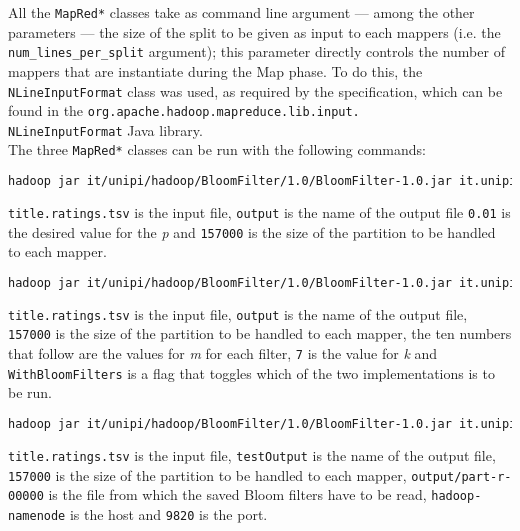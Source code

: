 \hfill \break
All the \texttt{MapRed*} classes take as command line argument --- among the other parameters --- the size of the split to be given as input to each mappers (i.e. the \texttt{num\_lines\_per\_split} argument); this parameter directly controls the number of mappers that are instantiate during the Map phase. To do this, the \texttt{NLineInputFormat} class was used, as required by the specification, which can be found in the \texttt{org.apache.hadoop.mapreduce.lib.input.\\NLineInputFormat} Java library.\\
\hfill \break
The three \texttt{MapRed*} classes can be run with the following commands:\\

\begin{lstlisting}[language=Bash, breaklines=true, backgroundcolor = \color{lightgray}]
hadoop jar it/unipi/hadoop/BloomFilter/1.0/BloomFilter-1.0.jar it.unipi.hadoop.MapRedComputeParams title.ratings.tsv output 0.01 157000
\end{lstlisting}
\hfill \break
\texttt{title.ratings.tsv} is the input file, \texttt{output} is the name of the output file \texttt{0.01} is the desired value for the \textit{p} and \texttt{157000} is the size of the partition to be handled to each mapper.

\begin{lstlisting}[language=Bash, breaklines=true, backgroundcolor = \color{lightgray}]
hadoop jar it/unipi/hadoop/BloomFilter/1.0/BloomFilter-1.0.jar it.unipi.hadoop.MapRedBloomFilter title.ratings.tsv output 157000 24404 63482 171928 420900 990060 2117062 3578304 3406703 1092505 156103 7 WithBloomFilters
\end{lstlisting}
\hfill \break
\texttt{title.ratings.tsv} is the input file, \texttt{output} is the name of the output file, \texttt{157000} is the size of the partition to be handled to each mapper, the ten numbers that follow are the values for \textit{m} for each filter, \texttt{7} is the value for \textit{k} and \texttt{WithBloomFilters} is a flag that toggles which of the two implementations is to be run.

\begin{lstlisting}[language=Bash, breaklines=true, backgroundcolor = \color{lightgray}]
hadoop jar it/unipi/hadoop/BloomFilter/1.0/BloomFilter-1.0.jar it.unipi.hadoop.MapRedFalsePositiveRateTest title.ratings.tsv testOutput 157000 output/part-r-00000 hadoop-namenode 9820
\end{lstlisting}
\hfill \break
\texttt{title.ratings.tsv} is the input file, \texttt{testOutput} is the name of the output file, \texttt{157000} is the size of the partition to be handled to each mapper, \texttt{output/part-r-00000} is the file from which the saved Bloom filters have to be read, \texttt{hadoop-namenode} is the host and \texttt{9820} is the port.